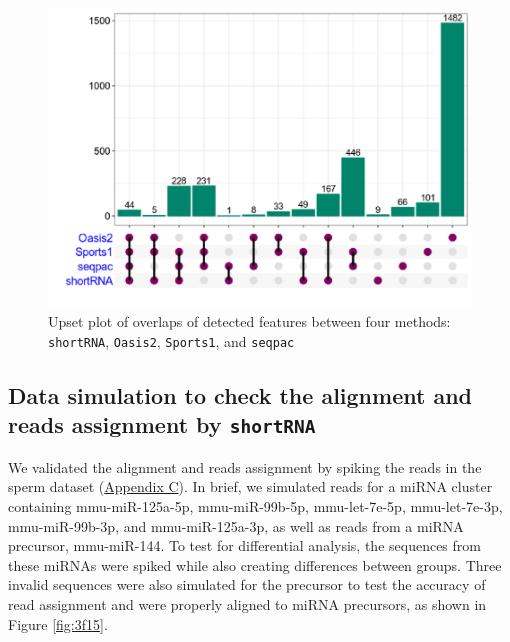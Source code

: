 \documentclass[12pt,twoside]{reedthesis}
\begin{document}
\begin{figure}[htbp]

{\centering \includegraphics{thesis_files/figure-latex/3f14-1} 

}

\caption{Upset plot of overlaps of detected features between four methods: \texttt{shortRNA}, \texttt{Oasis2}, \texttt{Sports1}, and \texttt{seqpac}}\label{fig:3f14}
\end{figure}
\hypertarget{data-simulation-to-check-the-alignment-and-reads-assignment-by-shortrna}{%
\subsection{\texorpdfstring{Data simulation to check the alignment and reads assignment by \texttt{shortRNA}}{Data simulation to check the alignment and reads assignment by shortRNA}}\label{data-simulation-to-check-the-alignment-and-reads-assignment-by-shortrna}}

We validated the alignment and reads assignment by spiking the reads in
the sperm dataset (\protect\hyperlink{ac}{Appendix C}). In brief, we simulated reads for a miRNA
cluster containing mmu-miR-125a-5p, mmu-miR-99b-5p, mmu-let-7e-5p,
mmu-let-7e-3p, mmu-miR-99b-3p, and mmu-miR-125a-3p, as well as reads
from a miRNA precursor, mmu-miR-144. To test for differential analysis,
the sequences from these miRNAs were spiked while also creating
differences between groups. Three invalid sequences were also simulated
for the precursor to test the accuracy of read assignment and were
properly aligned to miRNA precursors, as shown in Figure \ref{fig:3f15}.
\end{document}
